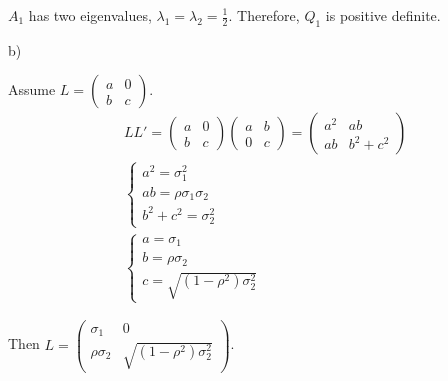 \documentclass[letterpaper, 11pt]{article}
\newcommand{\1}{\mathds{1}}	%
\theoremstyle{definition}
\begin{document}
$A_{1}$ has two eigenvalues, $\lambda_{1}=\lambda_{2}=\frac{1}{2}$. Therefore, $Q_{1}$ is positive definite.


b)

Assume $L = \begin{pmatrix}
        a & 0 \\
        b & c
    \end{pmatrix}$.
\begin{align*}
     & LL' = \begin{pmatrix}
                 a & 0 \\
                 b & c
             \end{pmatrix}\begin{pmatrix}
                              a & b \\
                              0 & c
                          \end{pmatrix} = \begin{pmatrix}
                                              a ^{2} & ab            \\
                                              ab     & b ^{2}+c ^{2}
                                          \end{pmatrix}        \\
     & \left\{\begin{array}{l}
                  a ^{2} = \sigma_{1}^{2}       \\
                  ab = \rho\sigma_{1}\sigma_{2} \\
                  b ^{2}+ c ^{2} = \sigma_{2}^{2}
              \end{array}\right.                            \\
     & \left\{\begin{array}{l}
                  a = \sigma_{1}     \\
                  b = \rho\sigma_{2} \\
                  c =\sqrt{(1-\rho ^{2})\sigma_{2}^{2}}
              \end{array}\right.
\end{align*}

Then $L = \begin{pmatrix}
        \sigma_{1}     & 0                                  \\
        \rho\sigma_{2} & \sqrt{(1-\rho ^{2})\sigma_{2}^{2}}
    \end{pmatrix}$.

\end{document}
